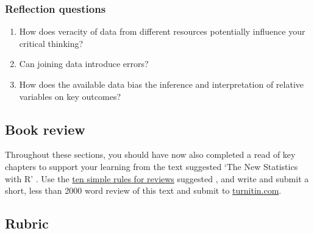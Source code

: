 \documentclass[
]{book}
\providecommand{\tightlist}{%
  \setlength{\itemsep}{0pt}\setlength{\parskip}{0pt}}
\begin{document}
\hypertarget{reflection-questions-4}{%
\subsubsection*{Reflection questions}\label{reflection-questions-4}}

\begin{enumerate}
\def\labelenumi{\arabic{enumi}.}
\tightlist
\item
  How does veracity of data from different resources potentially influence your critical thinking?\\
\item
  Can joining data introduce errors?
\item
  How does the available data bias the inference and interpretation of relative variables on key outcomes?
\end{enumerate}

\hypertarget{book-review}{%
\subsection*{Book review}\label{book-review}}

Throughout these sections, you should have now also completed a read of key chapters to support your learning from the text suggested `The New Statistics with R' \citep{RN6087}. Use the \href{https://journals.plos.org/ploscompbiol/article?id=10.1371/journal.pcbi.1006562}{ten simple rules for reviews} suggested \citep{RN6148}, and write and submit a short, less than 2000 word review of this text and submit to \href{https://www.turnitin.com}{turnitin.com}.

\hypertarget{rubric}{%
\subsection*{Rubric}\label{rubric}}
\end{document}
